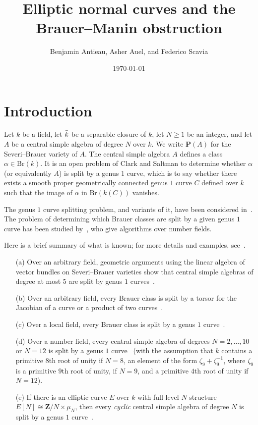 \documentclass[10pt,letterpaper,twoside]{article}
\title{Elliptic normal curves and the Brauer--Manin obstruction}
\author{Benjamin Antieau, Asher Auel, and Federico Scavia}
\date{\today}
\renewcommand{\1}{\mathbf{1}}
\newcommand{\bP}{\mathbf{P}}
\newcommand{\bZ}{\mathbf{Z}}
\renewcommand{\geq}{\geqslant}
\newcommand{\Br}{\mathrm{Br}}
\newcommand{\iso}{\cong}
\theoremstyle{plain}
\theoremstyle{plain}
\theoremstyle{definition}
\theoremstyle{named}
\theoremstyle{definition}
\begin{document}
	
	\maketitle
	\tableofcontents
	
	
	
	\section{Introduction}
	
	Let $k$ be a field, let $\Bar{k}$ be a separable closure of $k$, let $N\geq 1$ be an integer, and
	let $A$ be a central simple algebra of degree $N$ over $k$. We write $\bP(A)$ for the Severi--Brauer
	variety of $A$. The central simple algebra $A$ defines a class $\alpha\in\Br(k)$. It is an open
	problem of Clark and Saltman to determine whether $\alpha$ (or equivalently $A$) is split by a genus $1$ curve, which is
	to say whether there exists a smooth proper geometrically connected genus $1$ curve $C$ defined over
	$k$ such that the image of $\alpha$ in $\Br(k(C))$ vanishes.
	
	The genus $1$ curve splitting problem, and variants of it, have been considered
	in~\cite{dejong-ho,ho-lieblich,antieau-auel,saltman-genus,huybrechts-mattei}. The problem of determining
	which Brauer classes are split by a given genus $1$ curve has been studied
	by~\cite{ciperiani-krashen}, who give algorithms over number fields.
	
	Here is a brief summary of what is known; for more details and examples, see~\cite{antieau-auel}.
	\begin{enumerate}
		\item[(a)] Over an arbitrary field, geometric arguments using the linear algebra of vector
		bundles on Severi--Brauer varieties show that central simple algebras of
		degree at most $5$ are split by genus $1$ curves~\cite{dejong-ho}.
		\item[(b)] Over an arbitrary field, every Brauer class is split by a torsor for the Jacobian of
		a curve or a product of two curves~\cite{ho-lieblich}.
		\item[(c)] Over a local field, every Brauer class is split by a genus $1$ curve~\cite[Ex.~2.4]{antieau-auel}.
		\item[(d)] Over a number field, every central simple algebra of degrees $N=2,\ldots,10$ or $N=12$ is split
		by a genus $1$ curve~\cite{antieau-auel} (with the assumption that $k$ contains a primitive $8$th root of unity
		if $N=8$, an element of the form $\zeta_9+\zeta_9^{-1}$, where $\zeta_9$ is a primitive
		$9$th root of unity, if $N=9$, and a primitive $4$th root of unity if $N=12$).
		\item[(e)] If there is an elliptic curve $E$ over $k$ with full level $N$ structure
		$E[N]\iso\bZ/N\times\mu_N$, then every {\em cyclic} central simple algebra of degree $N$ is
		split by a genus $1$ curve~\cite{antieau-auel}.
	\end{enumerate}
	
\end{document}
